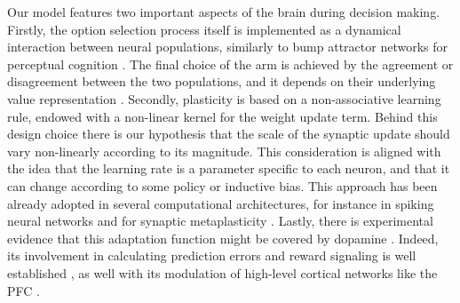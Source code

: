 Our model features two important aspects of the brain during decision making. Firstly, the option selection process itself is implemented as a dynamical interaction between neural populations, similarly to bump attractor networks for perceptual cognition \cite{carrollEncodingCertaintyBump2014, esnaola-acebesBumpAttractorDynamics2021}.
The final choice of the arm is achieved by the agreement or disagreement between the two populations, and it depends on their underlying value representation \cite{bariDynamicDecisionMaking2021, houstonMatchingBehavioursRewards2021}.
Secondly, plasticity is based on a non-associative learning rule, endowed with a non-linear kernel for the weight update term.
Behind this design choice there is our hypothesis that the scale of the synaptic update should vary non-linearly according to its magnitude.
This consideration is aligned with the idea that the learning rate is a parameter specific to each neuron, and that it can change according to some policy or inductive bias.
This approach has been already adopted in several computational architectures, for instance in spiking neural networks \cite{inglisModulationDopamineAdaptive2021} and for synaptic metaplasticity \cite{iigayaAdaptiveLearningDecisionmaking2016}.
Lastly, there is experimental evidence that this adaptation function might be covered by dopamine \cite{toblerAdaptiveCodingReward2005}.
Indeed, its involvement in calculating prediction errors and reward signaling is well established \cite{schultzNeuralSubstratePrediction1997}, as well with its modulation of  high-level cortical networks like the PFC \cite{didomenicoDopaminergicModulationPrefrontal2023, lohaniDopamineModulationPrefrontal2019, dardenneRolePrefrontalCortex2012}.
